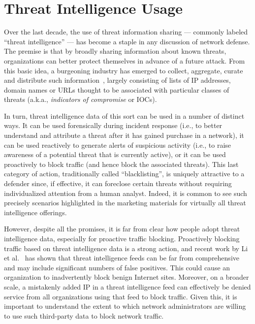 \chapter{Threat Intelligence Usage}
\label{chapter:data_usage}

Over the last decade, the use of threat information sharing ---
commonly labeled ``threat intelligence'' --- has become a staple
in any discussion of network defense.  The premise is that by broadly
sharing information about known threats, organizations can better
protect themselves in advance of a future attack.  From this basic
idea, a burgeoning industry has emerged to collect, aggregate, curate
and distribute such information~\cite{tipredict2018, tounsi2018survey},
largely consisting of lists of IP
addresses, domain names or URLs thought to be associated with
particular classes of threats (a.k.a., \textit{indicators of
  compromise} or IOCs).

In turn, threat intelligence data of this sort can be used in a number
of distinct ways.  It can be used forensically during incident response
(i.e., to better understand and attribute a threat after it has gained
purchase in a network), it can be used reactively to generate alerts
of suspicious activity (i.e., to raise awareness of a potential threat
that is currently active), or it can be used proactively to block
traffic (and hence block the associated threats).  This last category
of action, traditionally called ``blacklisting'', is uniquely
attractive to a defender since, if effective, it can foreclose certain
threats without requiring individualized attention from a human
analyst.  Indeed, it is common to see such precisely scenarios
highlighted in the marketing materials for virtually all threat
intelligence offerings.

However, despite all the promises, it is far from clear how people adopt
threat intelligence data, especially for proactive traffic blocking.
Proactively blocking traffic based on threat intelligence data is a strong
action, and recent work by Li et al.~\cite{li2019reading} has shown that
threat intelligence feeds can be far from comprehensive and may include
significant numbers of false positives. This could cause an organization
to inadvertently block benign Internet sites. Moreover, on a broader scale,
a mistakenly added IP in a threat intelligence feed can
effectively be denied service from all organizations using that feed
to block traffic. Given this, it is important to understand the extent
to which network administrators are willing to use such third-party data to
block network traffic.

